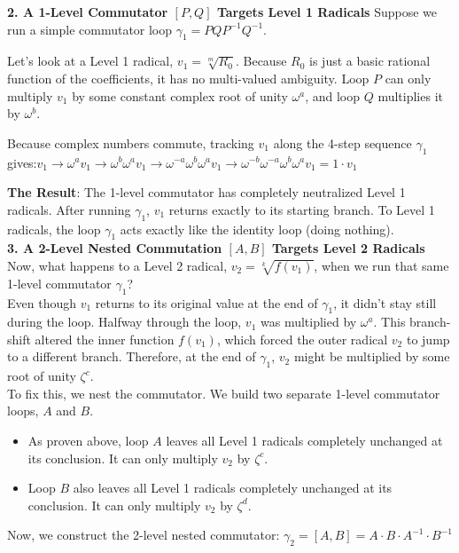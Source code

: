 {\bf 2. A 1-Level Commutator \([P, Q]\) Targets Level 1 Radicals}
Suppose we run a simple commutator loop \(\gamma_1 = PQP^{-1}Q^{-1}\).

Let's look at a Level 1 radical, \(v_1 = \sqrt[m]{R_0}\). Because \(R_{0}\) is just a basic rational function of the coefficients, it has no multi-valued ambiguity. 
Loop \(P\) can only multiply \(v_{1}\) by some constant complex root of unity \(\omega ^{a}\), and loop \(Q\) multiplies it by \(\omega ^{b}\).

Because complex numbers commute, tracking \(v_{1}\) along the 4-step sequence 
\(\gamma _{1}\) gives:\(v_{1}\rightarrow \omega ^{a}v_{1}\rightarrow \omega ^{b}\omega ^{a}v_{1}\rightarrow \omega ^{-a}\omega ^{b}\omega ^{a}v_{1}\rightarrow \omega ^{-b}\omega ^{-a}\omega ^{b}\omega ^{a}v_{1}=1\cdot v_{1}\)

{\bf The Result}: The 1-level commutator has completely neutralized Level 1 radicals. After running \(\gamma _{1}\), \(v_{1}\) returns exactly to its starting branch. To Level 1 radicals, the loop \(\gamma _{1}\) 
acts exactly like the identity loop (doing nothing).\\

{\bf 3. A 2-Level Nested Commutation \([A, B]\) Targets Level 2 Radicals}
Now, what happens to a Level 2 radical, \(v_2 = \sqrt[k]{f(v_1)}\), when we run that same 1-level commutator \(\gamma _{1}\)?\\
Even though \(v_{1}\) returns to its original value at the end of \(\gamma _{1}\), it didn't stay still during the loop.
Halfway through the loop, \(v_{1}\) was multiplied by \(\omega ^{a}\).
This branch-shift altered the inner function \(f(v_1)\), which forced the outer radical \(v_{2}\) to jump to a different branch. 
Therefore, at the end of \(\gamma _{1}\), \(v_{2}\) might be multiplied by some root of unity \(\zeta ^{c}\).\\

To fix this, we nest the commutator. We build two separate 1-level commutator loops, \(A\) and \(B\).
\begin{itemize}
\item[]As proven above, loop \(A\) leaves all Level 1 radicals completely unchanged at its conclusion. It can only multiply \(v_{2}\) by \(\zeta ^{c}\).
\item[]Loop \(B\) also leaves all Level 1 radicals completely unchanged at its conclusion. It can only multiply \(v_{2}\) by \(\zeta ^{d}\).
\end{itemize}
Now, we construct the 2-level nested commutator: \(\gamma _{2}=[A,B]=A\cdot B\cdot A^{-1}\cdot B^{-1}\)

